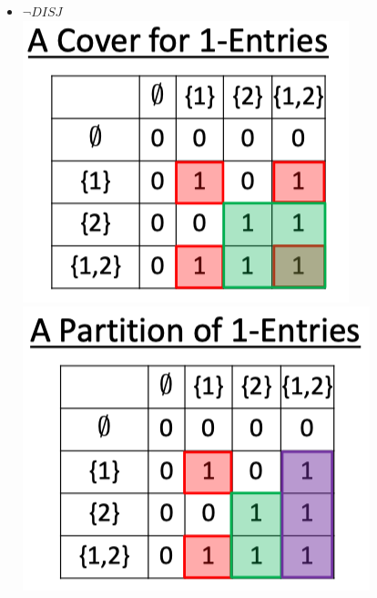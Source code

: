 \documentclass[10pt,landscape,a4paper]{article}
\begin{document}
\begin{multicols*}{3}
\begin{itemize}
    \item $\neg DISJ$ \\
    \includegraphics[scale=0.5]{not_disj1} \\
    \includegraphics[scale=0.5]{not_disj2}
\end{itemize}


\end{multicols*}
\end{document}
